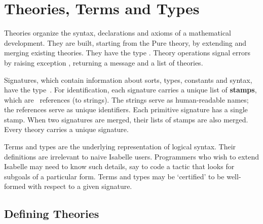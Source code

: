
\chapter{Theories, Terms and Types} \label{theories}
Theories organize the syntax, declarations and axioms of a mathematical
development.  They are built, starting from the Pure theory, by extending
and merging existing theories.  They have the \ML{} type .
Theory operations signal errors by raising exception ,
returning a message and a list of theories.

Signatures, which contain information about sorts, types, constants and
syntax, have the \ML{} type~.  For identification,
each signature carries a unique list of {\bf stamps}, which are~\ML{}
references (to strings).  The strings serve as human-readable names; the
references serve as unique identifiers.  Each primitive signature has a
single stamp.  When two signatures are merged, their lists of stamps are
also merged.  Every theory carries a unique signature.

Terms and types are the underlying representation of logical syntax.  Their
\ML{} definitions are irrelevant to naive Isabelle users.  Programmers who wish
to extend Isabelle may need to know such details, say to code a tactic that
looks for subgoals of a particular form.  Terms and types may be
`certified' to be well-formed with respect to a given signature.

\section{Defining Theories}
\label{DefiningTheories}

